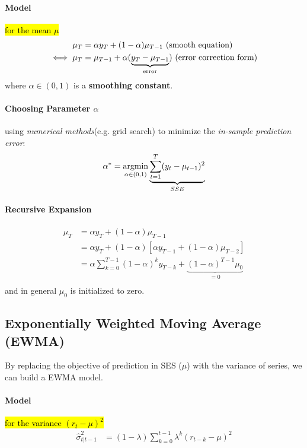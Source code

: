 \documentclass[11pt]{article}
\begin{document}
			\paragraph{Model} \hl{for the mean $\mu$}
				\begin{align}
					\mu_T &= \alpha y_T + (1 - \alpha)\mu_{T-1} \text{{ (smooth equation)}} \\
					\iff \mu_T &= \mu_{T-1} + \alpha (\underbrace{y_T - \mu_{T-1}}_{\text{{error}}}) \text{{ (error correction form)}}
				\end{align}
				where $\alpha \in (0, 1)$ is a \textbf{smoothing constant}.
				
			\paragraph{Choosing Parameter $\alpha$} using \emph{numerical methods}(e.g. grid search) to minimize the \emph{in-sample prediction error}:
				\begin{gather}
					\alpha^* = \operatorname*{argmin}_{\alpha \in (0, 1)} \underbrace{\sum_{t=1}^T(y_t - \mu_{t-1})^2}_{SSE}
				\end{gather}
			
			\paragraph{Recursive Expansion}
				\begin{align}
					\mu_T &= \alpha y_T + (1 - \alpha) \mu_{T-1} \\
					&= \alpha y_T + (1 - \alpha) [\alpha y_{T-1} + (1 - \alpha) \mu_{T-2}] \\
					&= \alpha \sum_{k=0}^{T-1}(1-\alpha)^k y_{T-k} + \underbrace{(1 - \alpha)^{T-1} \mu_0}_{=0} \\
				\end{align}
				and in general $\mu_0$ is initialized to zero.
		
		\subsection{Exponentially Weighted Moving Average (EWMA)}
			\begin{remark}
				By replacing the objective of prediction in SES ($\mu$) with the variance of series, we can build a EWMA model. 
			\end{remark}
			
			\paragraph{Model} \hl{for the variance $(r_t - \mu)^2$}
				\begin{align}
					\hat{\sigma}^2_{t|t-1} &= (1 - \lambda) \sum_{k=0}^{t-1} \lambda^k (r_{t-k} - \mu)^2 
				\end{align}
				
\end{document}
